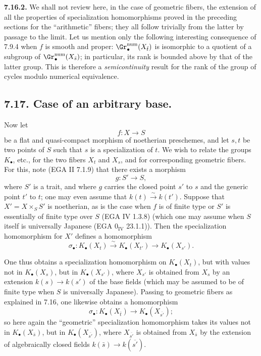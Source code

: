 %
\textbf{7.16.2.}
We shall not review here, in the case of geometric fibers, the extension of all the properties of specialization homomorphisms proved in the preceding sections for the ``arithmetic'' fibers; they all follow trivially from the latter by passage to the limit. Let us mention only the following interesting consequence of 7.9.4 when \(f\) is smooth and proper: \(\Gr_\bullet^{\mathrm{num}}(X_{\bar t})\) is isomorphic to a quotient of a subgroup of \(\Gr_\bullet^{\mathrm{num}}(X_{\bar s})\); in particular, its rank is bounded above by that of the latter group. This is therefore a \emph{semicontinuity} result for the rank of the group of cycles modulo numerical equivalence.

\subsection*{7.17. Case of an arbitrary base.}
Now let
\[
  f:X\longrightarrow S
\]
be a flat and quasi-compact morphism of noetherian preschemes, and let \(s,t\) be two points of \(S\) such that \(s\) is a specialization of \(t\). We wish to relate the groups \(K_\bullet\), etc., for the two fibers \(X_t\) and \(X_s\), and for corresponding geometric fibers. For this, note (EGA II 7.1.9) that there exists a morphism
\[
  g:S'\longrightarrow S,
\]
where \(S'\) is a trait, and where \(g\) carries the closed point \(s'\) to \(s\) and the generic point \(t'\) to \(t\); one may even assume that \(k(t)\xrightarrow{\sim}k(t')\). Suppose that \(X'=X\times_S S'\) is noetherian, as is the case when \(f\) is of finite type or \(S'\) is essentially of finite type over \(S\) (EGA IV 1.3.8) (which one may assume when \(S\) itself is universally Japanese (EGA \(0_{\mathrm{IV}}\) 23.1.1)). Then the specialization homomorphism for \(X'\) defines a homomorphism
\begin{equation}\tag{7.17.1}
  \sigma_\bullet:K_\bullet(X_t)\xrightarrow{\sim}K_\bullet(X_{t'})
  \longrightarrow K_\bullet(X_{s'}).
\end{equation}

%
One thus obtains a specialization homomorphism on \(K_\bullet(X_t)\), but with values not in \(K_\bullet(X_s)\), but in \(K_\bullet(X_{s'})\), where \(X_{s'}\) is obtained from \(X_s\) by an extension \(k(s)\to k(s')\) of the base fields (which may be assumed to be of finite type when \(S\) is universally Japanese). Passing to geometric fibers as explained in 7.16, one likewise obtains a homomorphism
\begin{equation}\tag{7.17.2}
  \sigma_\bullet:K_\bullet(X_{\bar t})\longrightarrow K_\bullet(X_{\overline{s'}});
\end{equation}
so here again the ``geometric'' specialization homomorphism takes its values not in \(K_\bullet(X_{\bar s})\), but in \(K_\bullet(X_{\overline{s'}})\), where \(X_{\overline{s'}}\) is obtained from \(X_{\bar s}\) by the extension of algebraically closed fields \(k(\bar s)\to k(\overline{s'})\).

